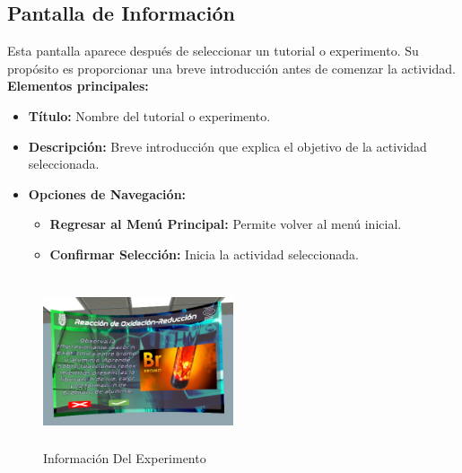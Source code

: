 \subsection{Pantalla de Información}
Esta pantalla aparece después de seleccionar un tutorial o experimento. Su propósito es proporcionar una breve introducción antes de comenzar la actividad.
\textbf{Elementos principales:}
\begin{itemize}
    \item \textbf{Título:} Nombre del tutorial o experimento.
    \item \textbf{Descripción:} Breve introducción que explica el objetivo de la actividad seleccionada.
    \item \textbf{Opciones de Navegación:}
    \begin{itemize}
        \item \textbf{Regresar al Menú Principal:} Permite volver al menú inicial.
        \item \textbf{Confirmar Selección:} Inicia la actividad seleccionada.
    \end{itemize}
\end{itemize}
\begin{figure}[thbp]
    \centering
    \includegraphics[width=0.5\textwidth, height = 5cm]{img/GUI/UI_Hub_Experiment.png}
    \caption{Información Del Experimento}
    \label{fig:Información_Del_Experimento}
\end{figure}
\newpage

